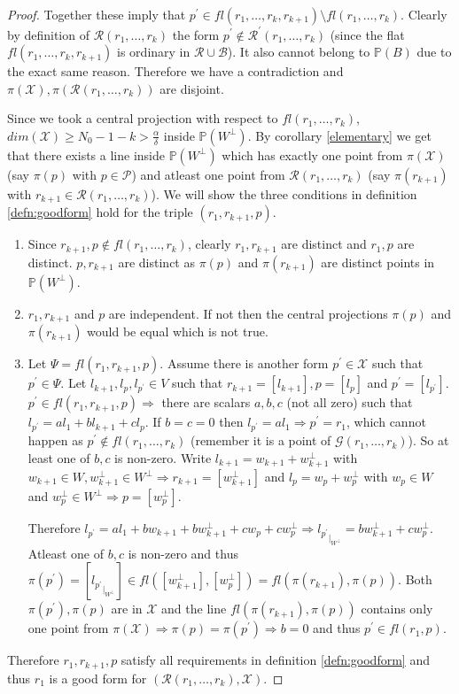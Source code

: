 \documentclass[12pt]{caltech_thesis}
\theoremstyle{plain}
\theoremstyle{definition}
\newcommand{\MB}{\mathcal{B}}
\newcommand{\MP}{\mathcal{P}}
\newcommand{\MR}{\mathcal{R}}
\newcommand{\MG}{\mathcal{G}}
\newcommand{\MX}{\mathcal{X}}
\newcommand{\PP}{\mathbb{P}}
\begin{document}
\begin{proof}
Together these imply that $p^\prime \in fl(r_1,\ldots,r_k,r_{k+1})\setminus fl(r_1,\ldots,r_k)$. Clearly by definition of $\MR(r_1,\ldots,r_k)$
the form $p^\prime\notin \MR^\prime(r_1,\ldots,r_k)$ (since the flat $fl(r_1,\ldots,r_k,r_{k+1})$ is ordinary in $\MR\cup \MB$). It also cannot 
belong to $\PP(B)$ due to the exact same reason. Therefore we have a contradiction and $\pi(\MX), \pi(\MR(r_1,\ldots,r_k))$ are disjoint.

Since we took a central projection with respect to $fl(r_1,\ldots,r_k)$, $dim(\MX) \geq N_0-1-k > \frac{\alpha}{\delta}$ inside $\PP(W^\perp)$. 
By corollary
\ref{elementary} we get that there exists a line inside $\PP(W^\perp)$ which has exactly one point from $\pi(\MX)$ (say $\pi(p)$ with $p\in \MP$)
and atleast one point from $\MR(r_1,\ldots,r_k)$ (say $\pi(r_{k+1})$ with $r_{k+1}\in \MR(r_1,\ldots,r_k)$). We will show the three conditions in
definition \ref{defn:goodform} hold for the triple $(r_1, r_{k+1}, p)$.
\begin{enumerate}
 \item Since $r_{k+1},p\notin fl(r_1,\ldots,r_k)$, clearly $r_1,r_{k+1}$ are distinct and $r_1,p$ are distinct. $p,r_{k+1}$ are distinct as
 $\pi(p)$ and $\pi(r_{k+1})$ are distinct points in $\PP(W^\perp)$.
 \item $r_1,r_{k+1}$ and $p$ are independent. If not then the central projections $\pi(p)$ and $\pi(r_{k+1})$ would be equal which is not true.
 \item Let $\Psi = fl(r_1,r_{k+1},p)$. Assume there is another form $p^\prime \in \MX$ such that $p^\prime \in \Psi$. 
 Let $l_{k+1},l_p,l_{p^\prime} \in
 V$ such that $r_{k+1} = [l_{k+1}], p = [l_p]$ and $p^\prime = [l_{p^\prime}]$. $p^\prime\in fl(r_1,r_{k+1},p) \Rightarrow$
 there are scalars $a,b,c$ (not all zero) such that $l_{p^\prime} = al_1 + bl_{k+1} + cl_p$. If $b=c=0$ then $l_{p^\prime} = al_1 \Rightarrow
 p^\prime = r_1$, which cannot happen as $p^\prime  \notin fl(r_1,\ldots,r_k)$ (remember it is a point of $\MG(r_1,\ldots,r_k)$). So 
 at least one of $b,c$ is non-zero. Write $l_{k+1} = w_{k+1} + w_{k+1}^\perp$ with $w_{k+1}\in W, w_{k+1}^\perp\in W^\perp \Rightarrow 
 r_{k+1} = [w_{k+1}^\perp]$ and
 $l_p = w_p + w_p^\perp$ with $w_p\in W$ and $w_p^\perp\in W^\perp \Rightarrow p = [w_p^\perp]$. 
 
 Therefore $l_{p^\prime} = al_1 + bw_{k+1} +bw_{k+1}^\perp + 
 cw_p + cw_p^\perp \Rightarrow {l_{p^\prime}}_{|_{W^\perp}} = bw_{k+1}^\perp + c w_p^\perp$. Atleast one of $b,c$ is non-zero and thus
 $\pi(p^\prime) = [{l_{p^\prime}}_{|_{W^\perp}}] \in fl([w_{k+1}^\perp], [w_p^\perp]) = fl(\pi(r_{k+1}), \pi(p))$. Both $\pi(p^\prime), \pi(p)$
 are in $\MX$ and the line $fl(\pi(r_{k+1}), \pi(p))$ contains only one point from $\pi(\MX) \Rightarrow \pi(p) = \pi(p^\prime)\Rightarrow b=0$
 and thus $p^\prime \in fl(r_1,p)$.
\end{enumerate}

Therefore $r_1,r_{k+1},p$ satisfy all requirements in definition \ref{defn:goodform} and thus $r_1$ is a good form for 
$(\MR(r_1,\ldots,r_k),\MX)$. 
\end{proof}
\end{document}
